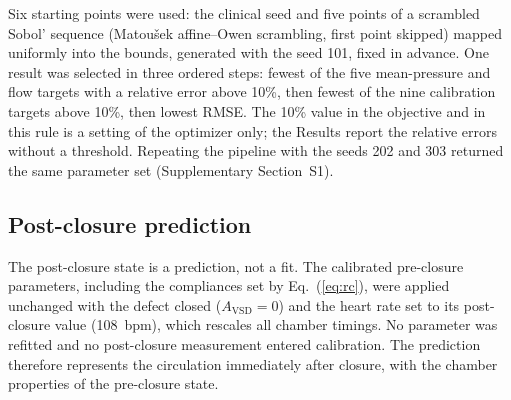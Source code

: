 \begin{table}[!htbp]
\centering\small
\setlength{\tabcolsep}{3pt}
\caption{Calibration stages for each starting point.}
\label{tab:stages}
\end{table}

Six starting points were used: the clinical seed and five points of a scrambled Sobol' sequence (Matou\v{s}ek affine--Owen scrambling, first point skipped) mapped uniformly into the bounds, generated with the seed 101, fixed in advance. One result was selected in three ordered steps: fewest of the five mean-pressure and flow targets with a relative error above 10\%, then fewest of the nine calibration targets above 10\%, then lowest RMSE. The 10\% value in the objective and in this rule is a setting of the optimizer only; the Results report the relative errors without a threshold. Repeating the pipeline with the seeds 202 and 303 returned the same parameter set (Supplementary Section~S1).

\FloatBarrier
\subsection{Post-closure prediction}
\label{sec:post_methods}
The post-closure state is a prediction, not a fit. The calibrated pre-closure parameters, including the compliances set by Eq.~(\ref{eq:rc}), were applied unchanged with the defect closed ($A_{\mathrm{VSD}} = 0$) and the heart rate set to its post-closure value (108~bpm), which rescales all chamber timings. No parameter was refitted and no post-closure measurement entered calibration. The prediction therefore represents the circulation immediately after closure, with the chamber properties of the pre-closure state.

